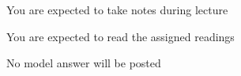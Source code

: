 \documentclass[20pt,handout,notes=show]{beamer}
\begin{document}
\begin{frame}
\begin{center}
\large
You are expected to take notes during lecture
\end{center}
\end{frame}

\begin{frame}
\begin{center}
\large
You are expected to read the assigned readings
\end{center}
\end{frame}

\begin{frame}
\begin{center}
\large
No model answer will be posted
\end{center}
\end{frame}
\end{document}
